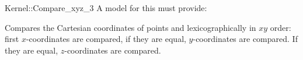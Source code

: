 \begin{ccRefFunctionObjectConcept}{Kernel::Compare_xyz_3}
A model for this must provide:


      {Compares the Cartesian coordinates of points  and
        lexicographically in $xy$ order: first 
       $x$-coordinates are compared, if they are equal, $y$-coordinates
       are compared. If they are equal, $z$-coordinates are compared.}

\end{ccRefFunctionObjectConcept}
